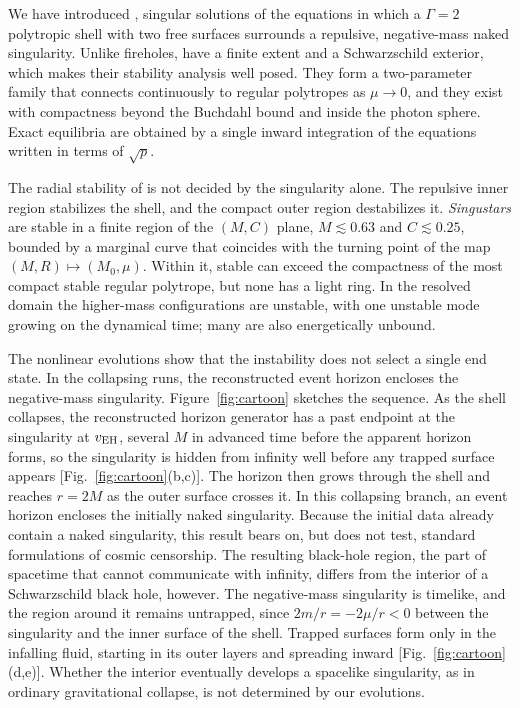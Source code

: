 \documentclass[%
 reprint,
 amsmath,amssymb,
 aps,prd,
 superscriptaddress,
]{revtex4-2}
\begin{document}
We have introduced , singular solutions of the \tov{} equations in which a $\Gamma=2$ polytropic shell with two free surfaces surrounds a repulsive, negative-mass naked singularity. Unlike fireholes,  have a finite extent and a Schwarzschild exterior, which makes their stability analysis well posed. They form a two-parameter family that connects continuously to regular polytropes as $\mu\to0$, and they exist with compactness beyond the Buchdahl bound and inside the photon sphere. Exact equilibria are obtained by a single inward integration of the \tov{} equations written in terms of $\sqrt{p}$.

The radial stability of  is not decided by the singularity alone. The repulsive inner region stabilizes the shell, and the compact outer region destabilizes it. \emph{Singustars} are stable in a finite region of the $(M,C)$ plane, $M\lesssim0.63$ and $C\lesssim0.25$, bounded by a marginal curve that coincides with the turning point of the map $(M,R)\mapsto(M_0,\mu)$. Within it, stable  can exceed the compactness of the most compact stable regular polytrope, but none has a light ring. In the resolved domain the higher-mass configurations are unstable, with one unstable mode growing on the dynamical time; many are also energetically unbound.

The nonlinear evolutions show that the instability does not select a single end state. In the collapsing runs, the reconstructed event horizon encloses the negative-mass singularity. Figure~\ref{fig:cartoon} sketches the sequence. As the shell collapses, the reconstructed horizon generator has a past endpoint at the singularity at $v_{\rm EH}$, several $M$ in advanced time before the apparent horizon forms, so the singularity is hidden from infinity well before any trapped surface appears [Fig.~\ref{fig:cartoon}(b,c)]. The horizon then grows through the shell and reaches $r=2M$ as the outer surface crosses it. In this collapsing branch, an event horizon encloses the initially naked singularity. Because the initial data already contain a naked singularity, this result bears on, but does not test, standard formulations of cosmic censorship. The resulting black-hole region, the part of spacetime that cannot communicate with infinity, differs from the interior of a Schwarzschild black hole, however. The negative-mass singularity is timelike, and the region around it remains untrapped, since $2m/r=-2\mu/r<0$ between the singularity and the inner surface of the shell. Trapped surfaces form only in the infalling fluid, starting in its outer layers and spreading inward [Fig.~\ref{fig:cartoon}(d,e)]. Whether the interior eventually develops a spacelike singularity, as in ordinary gravitational collapse, is not determined by our evolutions.
\end{document}
